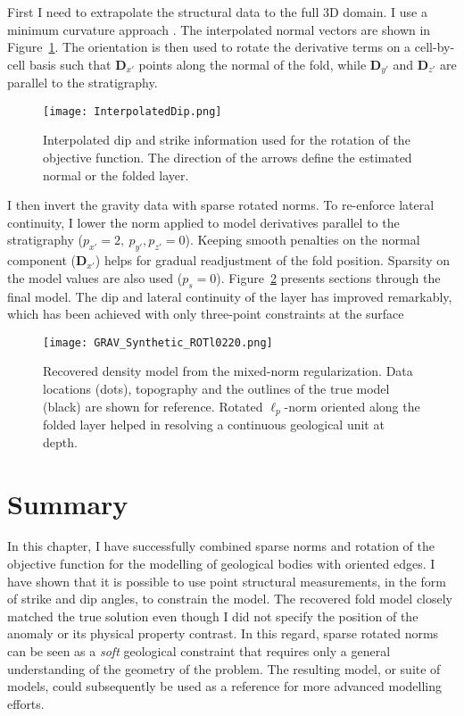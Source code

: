 First I need to extrapolate the structural data to the full 3D domain.
I use a minimum curvature approach \cite[]{Briggs74}. The interpolated normal vectors are shown in Figure~\ref{InterpolatedDip}. The orientation is then used to rotate the derivative terms on a cell-by-cell basis such that $\mathbf{D}_{x'}$ points along the normal of the fold, while $\mathbf{D}_{y'}$ and $\mathbf{D}_{z'}$ are parallel to the stratigraphy.
\begin{figure}[h!]
\centering
\texttt{[image: InterpolatedDip.png]}
\caption{Interpolated dip and strike information used for the rotation of the objective function. The direction of the arrows define the estimated normal or the folded layer.}
\label{InterpolatedDip}
\end{figure}

I then invert the gravity data with sparse rotated norms. To re-enforce lateral continuity, I lower the norm applied to model derivatives parallel to the stratigraphy ($p_{x'}=2,\: p_{y'}, p_{z'} = 0$). Keeping smooth penalties on the normal component ($\mathbf{D}_{x'}$) helps for gradual readjustment of the fold position. Sparsity on the model values are also used ($p_s=0$). Figure~\ref{Synthetic_Fold_RotatedlpModel} presents sections through the final model. The dip and lateral continuity of the layer has improved remarkably, which has been achieved with only three-point constraints at the surface
\begin{figure}[h!]
\centering
\texttt{[image: GRAV\_Synthetic\_ROTl0220.png]}\label{Synthetic_Fold_ROT_lpModel}
\caption{Recovered density model from the mixed-norm regularization. Data locations (dots), topography and the outlines of the true model (black) are shown for reference. Rotated $\ell_p$-norm oriented along the folded layer helped in resolving a continuous geological unit at depth.}
\label{Synthetic_Fold_RotatedlpModel}
\end{figure}

\section{Summary}

In this chapter, I have successfully combined sparse norms and rotation of the objective function for the modelling of geological bodies with oriented edges. I have shown that it is possible to use point structural measurements, in the form of strike and dip angles, to constrain the model. The recovered fold model closely matched the true solution even though I did not specify the position of the anomaly or its physical property contrast. In this regard, sparse rotated norms can be seen as a \emph{soft} geological constraint that requires only a general understanding of the geometry of the problem. The resulting model, or suite of models, could subsequently be used as a reference for more advanced modelling efforts.

